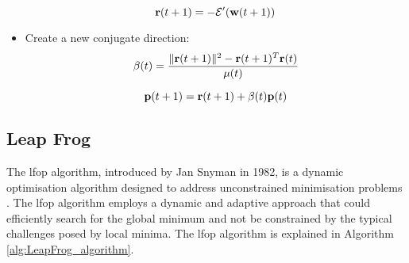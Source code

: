 \documentclass[10pt, conference]{IEEEtran}
\begin{document}
\begin{itemize}
    \begin{equation}
        \text{\textbf{r}}(t+1) = -\mathcal{E}'(\text{\textbf{w}}(t+1))
    \end{equation}

    \item Create a new conjugate direction:
    \begin{equation}
        \beta(t) = \frac{\| \text{\textbf{r}}(t+1) \|^2 - \text{\textbf{r}}(t+1)^T \text{\textbf{r}}(t)}{\mu(t)} \label{eq: conjugate_direction_beta}
    \end{equation}

    \begin{equation}
        \text{\textbf{p}}(t+1) = \text{\textbf{r}}(t+1) + \beta(t)\text{\textbf{p}}(t) \label{eq: p_values_update}
    \end{equation}
\end{itemize}

\subsection{Leap Frog} \label{section: LF_background}

The \acrshort{lfop} algorithm, introduced by Jan Snyman in 1982, is a dynamic optimisation algorithm designed to address
unconstrained minimisation problems \cite{leapfrog_ref}. The \acrshort{lfop} algorithm employs a dynamic and adaptive
approach that could efficiently search for the global minimum and not be constrained by the typical challenges posed by
local minima. The \acrshort{lfop} algorithm is explained in Algorithm \ref{alg:LeapFrog_algorithm}.
\end{document}

